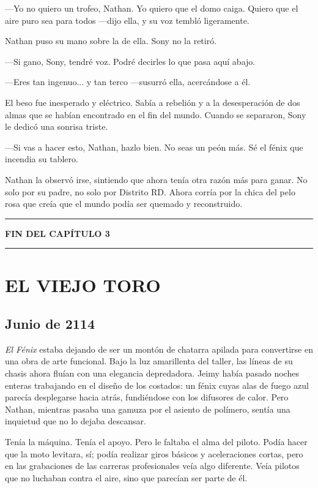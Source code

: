 \documentclass[12pt,a4paper]{book}
\begin{document}
---Yo no quiero un trofeo, Nathan. Yo quiero que el domo caiga. Quiero que el aire puro sea para todos ---dijo ella, y su voz tembló ligeramente.

Nathan puso su mano sobre la de ella. Sony no la retiró.

---Si gano, Sony, tendré voz. Podré decirles lo que pasa aquí abajo.

---Eres tan ingenuo... y tan terco ---susurró ella, acercándose a él.

El beso fue inesperado y eléctrico. Sabía a rebelión y a la desesperación de dos almas que se habían encontrado en el fin del mundo. Cuando se separaron, Sony le dedicó una sonrisa triste.

---Si vas a hacer esto, Nathan, hazlo bien. No seas un peón más. Sé el fénix que incendia su tablero.

Nathan la observó irse, sintiendo que ahora tenía otra razón más para ganar. No solo por su padre, no solo por Distrito RD. Ahora corría por la chica del pelo rosa que creía que el mundo podía ser quemado y reconstruido.

\bigskip
\noindent\rule{\textwidth}{0.4pt}
\bigskip

\textbf{FIN DEL CAPÍTULO 3}


\bigskip
\noindent\rule{\textwidth}{0.4pt}
\bigskip

\chapter{EL VIEJO TORO}

\section*{Junio de 2114}

\textit{El Fénix} estaba dejando de ser un montón de chatarra apilada para convertirse en una obra de arte funcional. Bajo la luz amarillenta del taller, las líneas de su chasis ahora fluían con una elegancia depredadora. Jeimy había pasado noches enteras trabajando en el diseño de los costados: un fénix cuyas alas de fuego azul parecía desplegarse hacia atrás, fundiéndose con los difusores de calor. Pero Nathan, mientras pasaba una gamuza por el asiento de polímero, sentía una inquietud que no lo dejaba descansar.

Tenía la máquina. Tenía el apoyo. Pero le faltaba el alma del piloto. Podía hacer que la moto levitara, sí; podía realizar giros básicos y aceleraciones cortas, pero en las grabaciones de las carreras profesionales veía algo diferente. Veía pilotos que no luchaban contra el aire, sino que parecían ser parte de él.
\end{document}
